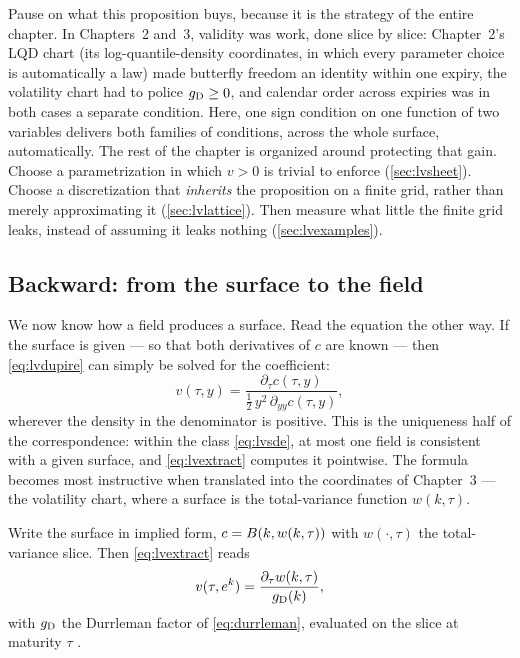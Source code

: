 Pause on what this proposition buys, because it is the strategy of the
entire chapter.  In Chapters~2 and~3, validity was work, done slice by
slice: Chapter~2's LQD chart (its log-quantile-density coordinates, in
which every parameter choice is automatically a law) made butterfly
freedom an identity within one
expiry, the volatility chart had to police $g_{\rm D}\ge0$, and
calendar order across expiries was in both cases a separate condition.
Here, one sign condition on one function of two variables delivers both
families of conditions, across the whole surface, automatically.  The
rest of the chapter is organized around protecting that gain.
Choose a parametrization in which $v>0$ is trivial to enforce
(\cref{sec:lvsheet}).  Choose a discretization that \emph{inherits} the
proposition on a finite grid, rather than merely approximating it
(\cref{sec:lvlattice}).  Then measure what little the finite grid
leaks, instead of assuming it leaks nothing (\cref{sec:lvexamples}).

\subsection{Backward: from the surface to the field}

We now know how a field produces a surface.  Read the equation the
other way.  If the surface is given --- so that both derivatives of $c$
are known --- then \eqref{eq:lvdupire} can simply be solved for the
coefficient:
\begin{equation}
v(\tau,y)=\frac{\partial_\tau c(\tau,y)}
{\tfrac12\,y^{2}\,\partial_{yy}c(\tau,y)},
\label{eq:lvextract}
\end{equation}
wherever the density in the denominator is positive.  This is the
uniqueness half of the correspondence: within the class
\eqref{eq:lvsde}, at most one field is consistent with a given surface,
and \eqref{eq:lvextract} computes it pointwise.  The formula becomes
most instructive when translated into the coordinates of Chapter~3 ---
the volatility chart, where a surface is the total-variance function
$w(k,\tau)$.

\begin{proposition}
\label{prop:lvratio}
Write the surface in implied form, $c=B(k,w(k,\tau))$ with
$w(\cdot,\tau)$ the total-variance slice.  Then \eqref{eq:lvextract}
reads
\begin{equation}
v(\tau,e^{k})=\frac{\partial_\tau w(k,\tau)}{g_{\rm D}(k)},
\label{eq:lvratio}
\end{equation}
with $g_{\rm D}$ the Durrleman factor of \eqref{eq:durrleman},
evaluated on the slice at maturity $\tau$ \citep{Gatheral2006}.
\end{proposition}

